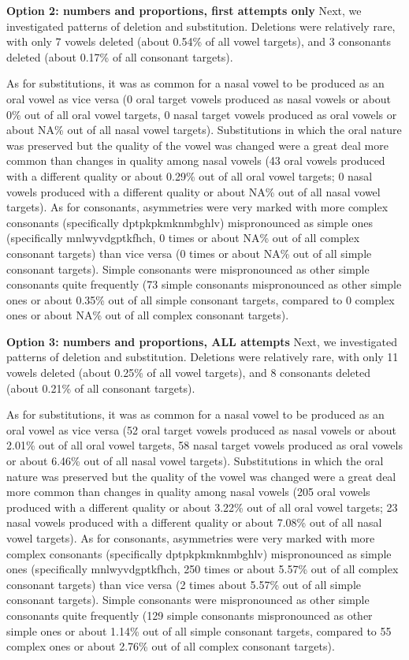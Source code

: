 \documentclass[english,,man,floatsintext]{apa6}
\begin{document}
\textbf{Option 2: numbers and proportions, first attempts only}
Next, we investigated patterns of deletion and substitution. Deletions were relatively rare, with only 7 vowels deleted (about 0.54\% of all vowel targets), and 3 consonants deleted (about 0.17\% of all consonant targets).

As for substitutions, it was as common for a nasal vowel to be produced as an oral vowel as vice versa (0 oral target vowels produced as nasal vowels or about 0\% out of all oral vowel targets, 0 nasal target vowels produced as oral vowels or about NA\% out of all nasal vowel targets). Substitutions in which the oral nature was preserved but the quality of the vowel was changed were a great deal more common than changes in quality among nasal vowels (43 oral vowels produced with a different quality or about 0.29\% out of all oral vowel targets; 0 nasal vowels produced with a different quality or about NA\% out of all nasal vowel targets). As for consonants, asymmetries were very marked with more complex consonants (specifically dptpkpkmknmbghlv) mispronounced as simple ones (specifically mnlwyvdgptkfhch, 0 times or about NA\% out of all complex consonant targets) than vice versa (0 times or about NA\% out of all simple consonant targets). Simple consonants were mispronounced as other simple consonants quite frequently (73 simple consonants mispronounced as other simple ones or about 0.35\% out of all simple consonant targets, compared to 0 complex ones or about NA\% out of all complex consonant targets).

\textbf{Option 3: numbers and proportions, ALL attempts}
Next, we investigated patterns of deletion and substitution. Deletions were relatively rare, with only 11 vowels deleted (about 0.25\% of all vowel targets), and 8 consonants deleted (about 0.21\% of all consonant targets).

As for substitutions, it was as common for a nasal vowel to be produced as an oral vowel as vice versa (52 oral target vowels produced as nasal vowels or about 2.01\% out of all oral vowel targets, 58 nasal target vowels produced as oral vowels or about 6.46\% out of all nasal vowel targets). Substitutions in which the oral nature was preserved but the quality of the vowel was changed were a great deal more common than changes in quality among nasal vowels (205 oral vowels produced with a different quality or about 3.22\% out of all oral vowel targets; 23 nasal vowels produced with a different quality or about 7.08\% out of all nasal vowel targets). As for consonants, asymmetries were very marked with more complex consonants (specifically dptpkpkmknmbghlv) mispronounced as simple ones (specifically mnlwyvdgptkfhch, 250 times or about 5.57\% out of all complex consonant targets) than vice versa (2 times about 5.57\% out of all simple consonant targets). Simple consonants were mispronounced as other simple consonants quite frequently (129 simple consonants mispronounced as other simple ones or about 1.14\% out of all simple consonant targets, compared to 55 complex ones or about 2.76\% out of all complex consonant targets).
\end{document}
